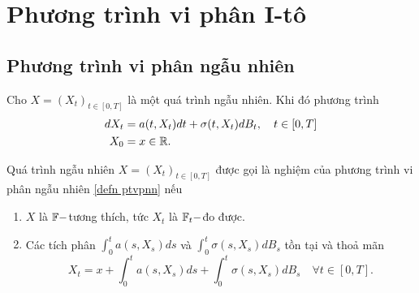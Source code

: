 \chapter{Phương trình vi phân I-tô}
\section{Phương trình vi phân ngẫu nhiên}
\begin{defn}
    Cho $X = (X_t)_{t \in [0, T]}$ là một quá trình ngẫu nhiên. Khi đó phương trình 
    \begin{align}\label{defn ptvpnn}
        dX_t &= a(t,X_t) dt + \sigma(t,X_t)dB_t, \quad t\in [0,T]\\
        X_0  &= x \in \mathbb{R}. \nonumber
    \end{align}
\end{defn}
\begin{defn}
    Quá trình ngẫu nhiên $X = (X_t)_{t\in [0,T]}$ được gọi là nghiệm của phương trình vi phân ngẫu nhiên \ref{defn ptvpnn} nếu 
    \begin{enumerate}
        \item $X$ là $\mathbb{F}-$tương thích, tức $X_t$ là $\mathbb{F}_t-$đo được.
        \item Các tích phân $\displaystyle \int_0^t{a(s,X_s)ds}$ và $\displaystyle \int_0^t{\sigma(s,X_s)dB_s}$ tồn tại và thoả mãn 
        \[X_t = x + \int_0^t{a(s,X_s)ds} + \int_0^t{\sigma(s,X_s)dB_s}\quad \forall t \in [0,T].\]
    \end{enumerate}
\end{defn}
